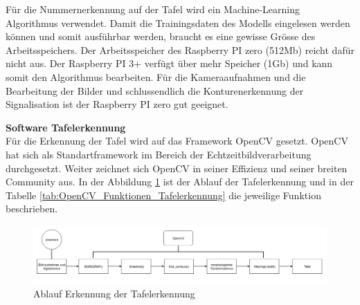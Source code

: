 \documentclass[../../main.tex]{subfiles}
\begin{document}
    Für die Nummernerkennung auf der Tafel wird ein Machine-Learning Algorithmus verwendet. Damit die Trainingsdaten des Modells eingelesen werden können und somit ausführbar werden, braucht es eine gewisse Grösse des Arbeitsspeichers. Der Arbeitsspeicher des Raspberry PI zero (512Mb) reicht dafür nicht aus. Der Raspberry PI 3+ verfügt über mehr Speicher (1Gb) und kann somit den Algorithmus bearbeiten. Für die Kameraaufnahmen und die Bearbeitung der Bilder und schlussendlich die Konturenerkennung der Signalisation ist der Raspberry PI zero  gut geeignet.
    \pagebreak

    \textbf{Software Tafelerkennung}\\
    Für die Erkennung der Tafel wird auf das Framework OpenCV gesetzt. OpenCV hat sich als Standartframework im Bereich der Echtzeitbildverarbeitung durchgesetzt. Weiter zeichnet sich OpenCV in seiner Effizienz und seiner breiten Community aus. In der Abbildung \ref{fig:ablauf_tafelerkennung} ist der Ablauf der Tafelerkennung und in der Tabelle \ref{tab:OpenCV_Funktionen_Tafelerkennung} die jeweilige Funktion beschrieben.



    \begin{figure}[H] %
        \centering
        \includegraphics[width=1\textwidth]{Ablauf_Tafelerkennung.png}
        \caption{Ablauf Erkennung der Tafelerkennung}
        \label{fig:ablauf_tafelerkennung}
    \end{figure}
\end{document}
